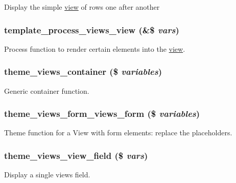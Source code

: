 \label{views_2theme_2theme_8inc_a98feb8e95b4f2a2cf7a901ae00cd8d97}
Display the simple \hyperlink{classview}{view} of rows one after another \hypertarget{views_2theme_2theme_8inc_abc6cc4b40163cbc48a4fa70dc1a17b8e}{
\subsubsection[{template\_\-process\_\-views\_\-view}]{\setlength{\rightskip}{0pt plus 5cm}template\_\-process\_\-views\_\-view (\&\$ {\em vars})}}
\label{views_2theme_2theme_8inc_abc6cc4b40163cbc48a4fa70dc1a17b8e}
Process function to render certain elements into the \hyperlink{classview}{view}. \hypertarget{views_2theme_2theme_8inc_ab7ef99fc936aacf3ebcbac40378f760f}{
\subsubsection[{theme\_\-views\_\-container}]{\setlength{\rightskip}{0pt plus 5cm}theme\_\-views\_\-container (\$ {\em variables})}}
\label{views_2theme_2theme_8inc_ab7ef99fc936aacf3ebcbac40378f760f}
Generic  container function. \hypertarget{views_2theme_2theme_8inc_a29ca03c025eb650d6aa308f0152f5323}{
\subsubsection[{theme\_\-views\_\-form\_\-views\_\-form}]{\setlength{\rightskip}{0pt plus 5cm}theme\_\-views\_\-form\_\-views\_\-form (\$ {\em variables})}}
\label{views_2theme_2theme_8inc_a29ca03c025eb650d6aa308f0152f5323}
Theme function for a View with form elements: replace the placeholders. \hypertarget{views_2theme_2theme_8inc_a339c44eecedc5e7219039007984a2cab}{
\subsubsection[{theme\_\-views\_\-view\_\-field}]{\setlength{\rightskip}{0pt plus 5cm}theme\_\-views\_\-view\_\-field (\$ {\em vars})}}
\label{views_2theme_2theme_8inc_a339c44eecedc5e7219039007984a2cab}
Display a single views field.

